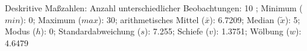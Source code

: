 				\label{tableValues:pocc67e}
				\vspace*{-\baselineskip}
                    \begin{noten}
                	    \note{} Deskritive Maßzahlen:
                	    Anzahl unterschiedlicher Beobachtungen: 10%
                	    ; 
                	      Minimum ($min$): 0; 
                	      Maximum ($max$): 30; 
                	      arithmetisches Mittel ($\bar{x}$): \num[round-mode=places,round-precision=2]{6,7209}; 
                	      Median ($\tilde{x}$): 5; 
                	      Modus ($h$): 0; 
                	      Standardabweichung ($s$): \num[round-mode=places,round-precision=2]{7,255}; 
                	      Schiefe ($v$): \num[round-mode=places,round-precision=2]{1,3751}; 
                	      Wölbung ($w$): \num[round-mode=places,round-precision=2]{4,6479}
                     \end{noten}


